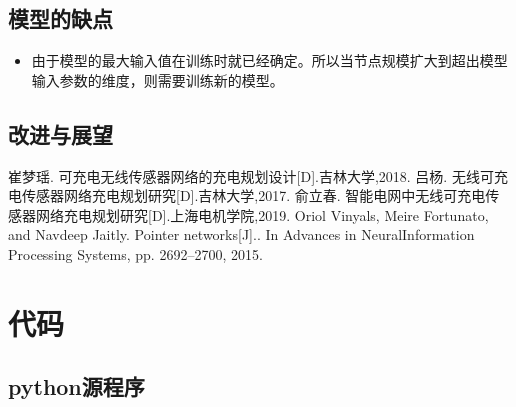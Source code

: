 \documentclass{whutmod}
\newcommand{\upcite}[1]{\textsuperscript{\textsuperscript{\cite{#1}}}}
\begin{document}
\subsection{模型的缺点}

\begin{itemize}
	\item 由于模型的最大输入值在训练时就已经确定。所以当节点规模扩大到超出模型输入参数的维度，则需要训练新的模型。
\end{itemize}

\subsection{改进与展望}


\appendix %
\begin{thebibliography}{9}%
	崔梦瑶. 可充电无线传感器网络的充电规划设计[D].吉林大学,2018.
	吕杨. 无线可充电传感器网络充电规划研究[D].吉林大学,2017.
	俞立春. 智能电网中无线可充电传感器网络充电规划研究[D].上海电机学院,2019.
     Oriol Vinyals, Meire Fortunato, and Navdeep Jaitly. Pointer networks[J].. In Advances in NeuralInformation Processing Systems, pp. 2692–2700, 2015.
\end{thebibliography}
\section{代码}
\subsection{python源程序}

\end{document}
